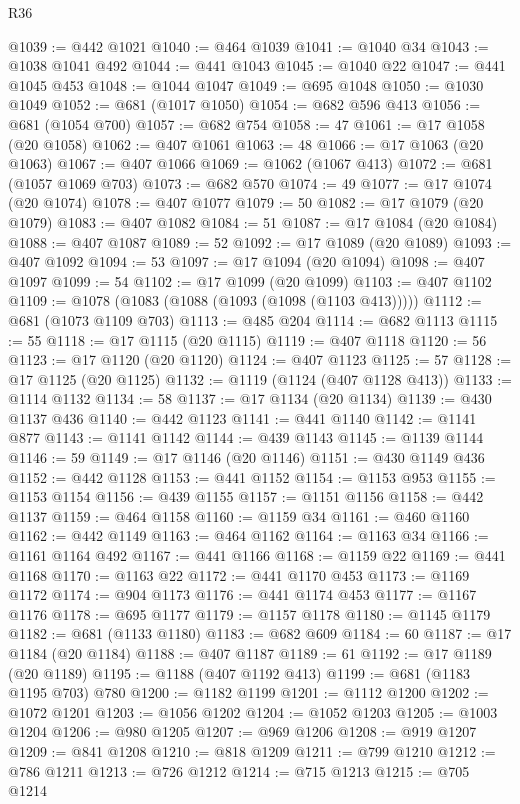 \begin{lexlean}{R36}
\begin{coremodule}
{{{{{{{{{{{{{{{{{{{{{{{{{{{{{{{{{{{{{{{{{{{{{{{{{{{{{{{{{{{{{{{{{{{{{{{{{{{{{{{{{{@1039 := @442 @1021
@1040 := @464 @1039
@1041 := @1040 @34
@1043 := @1038 @1041 @492
@1044 := @441 @1043
@1045 := @1040 @22
@1047 := @441 @1045 @453
@1048 := @1044 @1047
@1049 := @695 @1048
@1050 := @1030 @1049
@1052 := @681 (@1017 @1050)
@1054 := @682 @596 @413
@1056 := @681 (@1054 @700)
@1057 := @682 @754
@1058 := 47
@1061 := @17 @1058 (@20 @1058)
@1062 := @407 @1061
@1063 := 48
@1066 := @17 @1063 (@20 @1063)
@1067 := @407 @1066
@1069 := @1062 (@1067 @413)
@1072 := @681 (@1057 @1069 @703)
@1073 := @682 @570
@1074 := 49
@1077 := @17 @1074 (@20 @1074)
@1078 := @407 @1077
@1079 := 50
@1082 := @17 @1079 (@20 @1079)
@1083 := @407 @1082
@1084 := 51
@1087 := @17 @1084 (@20 @1084)
@1088 := @407 @1087
@1089 := 52
@1092 := @17 @1089 (@20 @1089)
@1093 := @407 @1092
@1094 := 53
@1097 := @17 @1094 (@20 @1094)
@1098 := @407 @1097
@1099 := 54
@1102 := @17 @1099 (@20 @1099)
@1103 := @407 @1102
@1109 := @1078 (@1083 (@1088 (@1093 (@1098 (@1103 @413)))))
@1112 := @681 (@1073 @1109 @703)
@1113 := @485 @204
@1114 := @682 @1113
@1115 := 55
@1118 := @17 @1115 (@20 @1115)
@1119 := @407 @1118
@1120 := 56
@1123 := @17 @1120 (@20 @1120)
@1124 := @407 @1123
@1125 := 57
@1128 := @17 @1125 (@20 @1125)
@1132 := @1119 (@1124 (@407 @1128 @413))
@1133 := @1114 @1132
@1134 := 58
@1137 := @17 @1134 (@20 @1134)
@1139 := @430 @1137 @436
@1140 := @442 @1123
@1141 := @441 @1140
@1142 := @1141 @877
@1143 := @1141 @1142
@1144 := @439 @1143
@1145 := @1139 @1144
@1146 := 59
@1149 := @17 @1146 (@20 @1146)
@1151 := @430 @1149 @436
@1152 := @442 @1128
@1153 := @441 @1152
@1154 := @1153 @953
@1155 := @1153 @1154
@1156 := @439 @1155
@1157 := @1151 @1156
@1158 := @442 @1137
@1159 := @464 @1158
@1160 := @1159 @34
@1161 := @460 @1160
@1162 := @442 @1149
@1163 := @464 @1162
@1164 := @1163 @34
@1166 := @1161 @1164 @492
@1167 := @441 @1166
@1168 := @1159 @22
@1169 := @441 @1168
@1170 := @1163 @22
@1172 := @441 @1170 @453
@1173 := @1169 @1172
@1174 := @904 @1173
@1176 := @441 @1174 @453
@1177 := @1167 @1176
@1178 := @695 @1177
@1179 := @1157 @1178
@1180 := @1145 @1179
@1182 := @681 (@1133 @1180)
@1183 := @682 @609
@1184 := 60
@1187 := @17 @1184 (@20 @1184)
@1188 := @407 @1187
@1189 := 61
@1192 := @17 @1189 (@20 @1189)
@1195 := @1188 (@407 @1192 @413)
@1199 := @681 (@1183 @1195 @703) @780
@1200 := @1182 @1199
@1201 := @1112 @1200
@1202 := @1072 @1201
@1203 := @1056 @1202
@1204 := @1052 @1203
@1205 := @1003 @1204
@1206 := @980 @1205
@1207 := @969 @1206
@1208 := @919 @1207
@1209 := @841 @1208
@1210 := @818 @1209
@1211 := @799 @1210
@1212 := @786 @1211
@1213 := @726 @1212
@1214 := @715 @1213
@1215 := @705 @1214
}}}}}}}}}}}}}}}}}}}}}}}}}}}}}}}}}}}}}}}}}}}}}}}}}}}}}}}}}}}}}}}}}}}}}}}}}}}}}}}}}}
\end{coremodule}
\end{lexlean}
